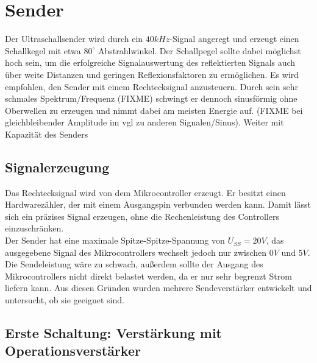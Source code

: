 


\chapter{Sender} %
Der Ultraschallsender wird durch ein $40 kHz$-Signal angeregt und erzeugt einen Schallkegel mit etwa $80^\circ$ Abstrahlwinkel. Der Schallpegel sollte dabei möglichst hoch sein, um die erfolgreiche Signalauswertung des reflektierten Signals auch über weite Distanzen und geringen Reflexionsfaktoren zu ermöglichen. Es wird empfohlen, den Sender mit einem Rechtecksignal anzusteuern. Durch sein sehr schmales Spektrum/Frequenz (FIXME) schwingt er dennoch sinusförmig ohne Oberwellen zu erzeugen und nimmt dabei am meisten Energie auf. (FIXME bei gleichbleibender Amplitude im vgl zu anderen Signalen/Sinus). Weiter mit Kapazität des Senders


\section{Signalerzeugung}
Das Rechtecksignal wird von dem Mikrocontroller erzeugt. Er besitzt einen Hardwarezähler, der mit einem Ausgangspin verbunden werden kann. Damit lässt sich ein präzises Signal erzeugen, ohne die Rechenleistung des Controllers einzuschränken.\\
Der Sender hat eine maximale Spitze-Spitze-Spannung von $U_{SS} = 20V$, das ausgegebene Signal des Mikrocontrollers wechselt jedoch nur zwischen $0V$ und $5V$. Die Sendeleistung wäre zu schwach, außerdem sollte der Ausgang des Mikrocontrollers nicht direkt belastet werden, da er nur sehr begrenzt Strom liefern kann. Aus diesen Gründen wurden mehrere Sendeverstärker entwickelt und untersucht, ob sie geeignet sind.



\section{Erste Schaltung: Verstärkung mit Operationsverstärker}
